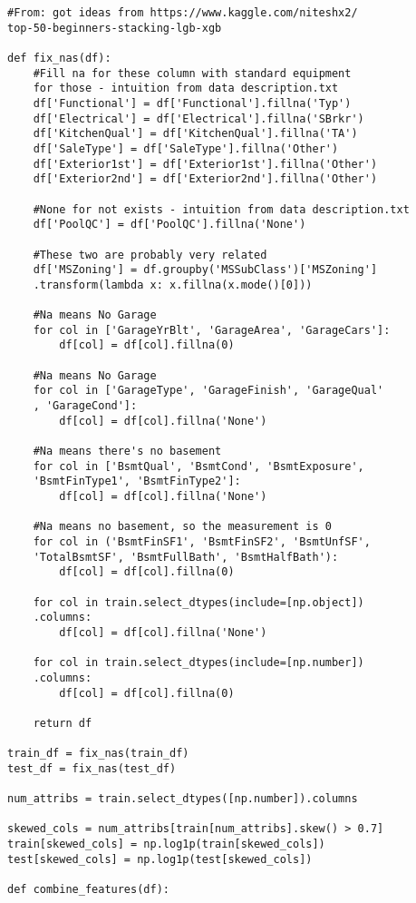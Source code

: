 \documentclass[12pt]{article}%
\begin{document}
\begin{lstlisting}
#From: got ideas from https://www.kaggle.com/niteshx2/
top-50-beginners-stacking-lgb-xgb

def fix_nas(df):
    #Fill na for these column with standard equipment
    for those - intuition from data description.txt
    df['Functional'] = df['Functional'].fillna('Typ') 
    df['Electrical'] = df['Electrical'].fillna('SBrkr')
    df['KitchenQual'] = df['KitchenQual'].fillna('TA')
    df['SaleType'] = df['SaleType'].fillna('Other')
    df['Exterior1st'] = df['Exterior1st'].fillna('Other')
    df['Exterior2nd'] = df['Exterior2nd'].fillna('Other')
    
    #None for not exists - intuition from data description.txt
    df['PoolQC'] = df['PoolQC'].fillna('None')
    
    #These two are probably very related
    df['MSZoning'] = df.groupby('MSSubClass')['MSZoning']
    .transform(lambda x: x.fillna(x.mode()[0]))
    
    #Na means No Garage
    for col in ['GarageYrBlt', 'GarageArea', 'GarageCars']:
        df[col] = df[col].fillna(0)
    
    #Na means No Garage 
    for col in ['GarageType', 'GarageFinish', 'GarageQual'
    , 'GarageCond']:
        df[col] = df[col].fillna('None')
    
    #Na means there's no basement
    for col in ['BsmtQual', 'BsmtCond', 'BsmtExposure',
    'BsmtFinType1', 'BsmtFinType2']:
        df[col] = df[col].fillna('None')
    
    #Na means no basement, so the measurement is 0
    for col in ('BsmtFinSF1', 'BsmtFinSF2', 'BsmtUnfSF',
    'TotalBsmtSF', 'BsmtFullBath', 'BsmtHalfBath'):
        df[col] = df[col].fillna(0)
        
    for col in train.select_dtypes(include=[np.object])
    .columns:
        df[col] = df[col].fillna('None')
        
    for col in train.select_dtypes(include=[np.number])
    .columns:
        df[col] = df[col].fillna(0)
    
    return df

train_df = fix_nas(train_df)
test_df = fix_nas(test_df)

num_attribs = train.select_dtypes([np.number]).columns

skewed_cols = num_attribs[train[num_attribs].skew() > 0.7]
train[skewed_cols] = np.log1p(train[skewed_cols])
test[skewed_cols] = np.log1p(test[skewed_cols])

def combine_features(df):
    

\end{lstlisting}
\end{document}
